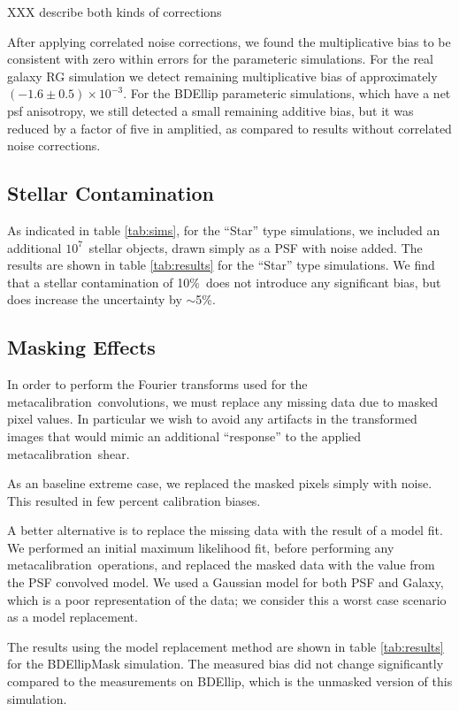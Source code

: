 \documentclass[usegraphicx,usenatbib]{mn2e}
\newcommand{\mcal}{metacalibration}
\newcommand{\nsimNstar}{$10^7$}
\newcommand{\nsimNstarperc}{10\%}
\newcommand{\rgbias}{$(-1.6 \pm 0.5) \times 10^{-3}$}
\begin{document}
XXX describe both kinds of corrections

After applying correlated noise corrections, we found the multiplicative bias
to be consistent with zero within errors for the parameteric simulations. For
the real galaxy RG simulation we detect remaining multiplicative bias of
approximately \rgbias.  For the BDEllip parameteric simulations, which have a
net psf anisotropy, we still detected a small remaining additive bias, but it
was reduced by a factor of five in amplitied, as compared to results without
correlated noise corrections.

\subsection{Stellar Contamination} \label{sec:stars}

As indicated in table \ref{tab:sims}, for the ``Star'' type simulations, we
included an additional \nsimNstar\ stellar objects, drawn simply as a PSF with
noise added.  The results are shown in table \ref{tab:results} for the ``Star''
type simulations.  We find that a stellar contamination of 
\nsimNstarperc\ does not introduce any significant bias, but does
increase the uncertainty by $\sim$5\%.

\subsection{Masking Effects} \label{sec:masking}

In order to perform the Fourier transforms used for the \mcal\ convolutions, we
must replace any missing data due to masked pixel values.  In particular we
wish to avoid any artifacts in the transformed images that would mimic an
additional ``response'' to the applied \mcal\ shear.

As an baseline extreme case, we replaced the masked pixels simply with noise.
This resulted in few percent calibration biases.

A better alternative is to replace the missing data with the result of a model
fit.  We performed an initial maximum likelihood fit, before performing any
\mcal\ operations, and replaced the masked data with the value from the PSF
convolved model.  We used a Gaussian model for both PSF and Galaxy, which is a
poor representation of the data; we consider this a worst case scenario as a
model replacement. 

The results using the model replacement method are shown in table
\ref{tab:results} for the BDEllipMask simulation.  The measured bias did not
change significantly compared to the measurements on BDEllip, which is the
unmasked version of this simulation.
\end{document}

